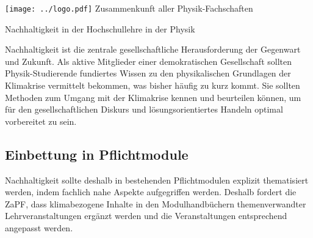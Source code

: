 \documentclass[DIV=calc]{scrartcl}
\begin{document}
\hspace{0.87\textwidth}
\begin{minipage}{120pt}
\vspace{-1.8cm}
\texttt{[image: ../logo.pdf]}
\centering
	\small Zusammenkunft aller Physik-Fachschaften
\end{minipage}

\begin{center}
  \huge{Nachhaltigkeit in der Hochschullehre in der Physik}\vspace{.25\baselineskip}\\
  \normalsize
\end{center}
\vspace{1cm}








Nachhaltigkeit ist die zentrale gesellschaftliche Herausforderung der Gegenwart und Zukunft. Als aktive Mitglieder einer demokratischen Gesellschaft sollten Physik-Studierende fundiertes Wissen zu den physikalischen Grundlagen der Klimakrise vermittelt bekommen, was bisher häufig zu kurz kommt. Sie sollten Methoden zum Umgang mit der Klimakrise kennen und beurteilen können, um für den gesellschaftlichen Diskurs und lösungsorientiertes Handeln optimal vorbereitet zu sein. 

\subsection*{Einbettung in Pflichtmodule}
Nachhaltigkeit sollte deshalb in bestehenden Pflichtmodulen explizit thematisiert werden, indem fachlich nahe Aspekte aufgegriffen werden. Deshalb fordert die ZaPF, dass klimabezogene Inhalte in den Modulhandbüchern themenverwandter Lehrveranstaltungen ergänzt werden und die Veranstaltungen entsprechend angepasst werden.
\end{document}
